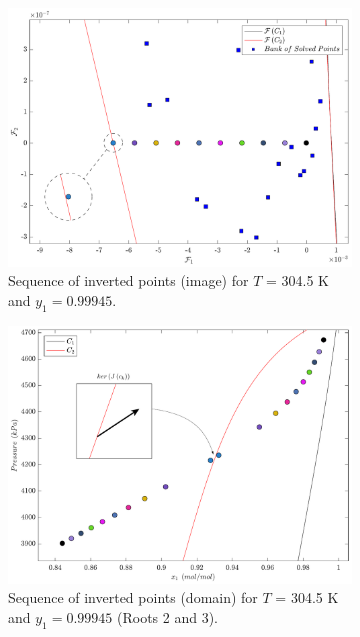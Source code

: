 \documentclass[journal=iecred,manuscript=article]{achemso}
\theoremstyle{definition}
\theoremstyle{remark}
\begin{document}
\begin{figure}
\centering
\begin{subfigure}{.48\textwidth}
  \centering
  \includegraphics[width=\linewidth]{imagem3.pdf}
  \caption{Sequence of inverted points (image) for $T$ = 304.5 K and $y_1 = 0.99945$.}
  \label{fig:imagem_S}
\end{subfigure}\hfill
\begin{subfigure}{.48\textwidth}
  \centering
  \includegraphics[width=\linewidth]{dominio3.pdf}
  \caption{Sequence of inverted points (domain) for $T$ = 304.5 K and $y_1 = 0.99945$ (Roots 2 and 3).}
  \label{fig:domain_S}
\end{subfigure}
\caption{}
\label{fig:L_path_domain_image}
\end{figure}
\end{document}
